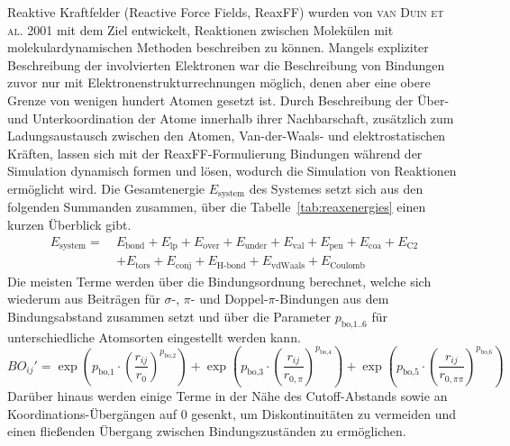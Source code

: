 Reaktive Kraftfelder (Reactive Force Fields, ReaxFF) wurden von \textsc{van Duin et al.}\cite{van_duin_reaxff:_2001} 2001 mit dem Ziel entwickelt, Reaktionen zwischen Molekülen mit molekulardynamischen Methoden beschreiben zu können.
Mangels expliziter Beschreibung der involvierten Elektronen war die Beschreibung von Bindungen zuvor nur mit Elektronenstrukturrechnungen möglich, denen aber eine obere Grenze von wenigen hundert Atomen gesetzt ist.
Durch Beschreibung der Über- und Unterkoordination der Atome innerhalb ihrer Nachbarschaft, zusätzlich zum Ladungsaustausch zwischen den Atomen, Van-der-Waals- und elektrostatischen Kräften, lassen sich mit der ReaxFF-Formulierung Bindungen während der Simulation dynamisch formen und lösen, wodurch die Simulation von Reaktionen ermöglicht wird.
Die Gesamtenergie $E_\text{system}$ des Systemes setzt sich aus den folgenden Summanden zusammen, über die Tabelle~\ref{tab:reaxenergies} einen kurzen Überblick gibt.
\begin{align}
  \label{reaxformulation}
  E_\text{system} =~& E_\text{bond} + E_\text{lp} + E_\text{over} + E_\text{under} + E_\text{val} + E_\text{pen} + E_\text{coa} + E_\text{C2} \\
  \nonumber  & + E_\text{tors} + E_\text{conj} + E_\text{H-bond} + E_\text{vdWaals} + E_\text{Coulomb}
\end{align}
Die meisten Terme werden über die Bindungsordnung berechnet, welche sich wiederum aus Beiträgen für $\sigma$-, $\pi$- und Doppel-$\pi$-Bindungen aus dem Bindungsabstand zusammen setzt und über die Parameter $p_{\text{bo,1..6}}$ für unterschiedliche Atomsorten eingestellt werden kann.
\begin{equation}
  BO_{ij}' = \exp\left( p_{\text{bo,1}} \cdot \left( \frac{r_{ij}}{r_0} \right)^{p_\text{bo,2}} \right) + \exp\left( p_{\text{bo,3}} \cdot \left( \frac{r_{ij}}{r_{0,\pi}} \right)^{p_\text{bo,4}} \right) + \exp\left( p_{\text{bo,5}} \cdot \left( \frac{r_{ij}}{r_{0,\pi\pi}} \right)^{p_\text{bo,6}} \right)
\end{equation}
Darüber hinaus werden einige Terme in der Nähe des Cutoff-Abstands sowie an Koordinations-Übergängen auf 0 gesenkt, um Diskontinuitäten zu vermeiden und einen fließenden Übergang zwischen Bindungszuständen zu ermöglichen.

